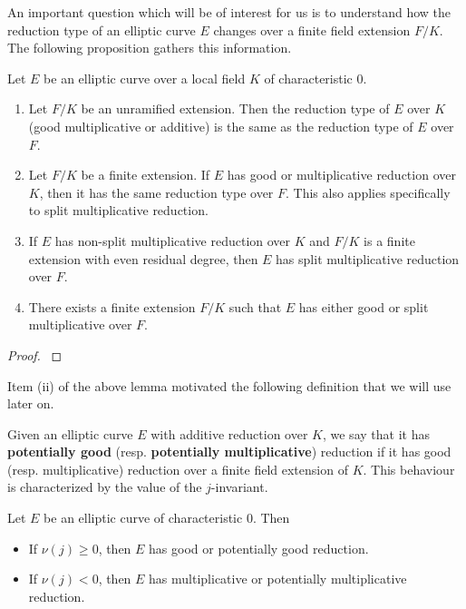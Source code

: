 An important question which will be of interest for us is to understand how the reduction type of an elliptic curve $E$ changes over a finite field extension $F/K$. The following proposition gathers this information.

\begin{prop}\label{prop_semi_red}
    Let $E$ be an elliptic curve over a local field $K$ of characteristic $0$. 
    \begin{enumerate}[label={(\roman*)}]
        \item Let $F/K$ be an unramified extension. Then the reduction type of $E$ over $K$ (good multiplicative or additive) is the same as the reduction type of $E$ over $F$.
        \item Let $F/K$ be a finite extension. If $E$ has good or multiplicative reduction over $K$, then it has the same reduction type over $F$. This also applies specifically to split multiplicative reduction.
        \item If $E$ has non-split multiplicative reduction over $K$ and $F/K$ is a finite extension with even residual degree, then $E$ has split multiplicative reduction over $F$. 
        \item There exists a finite extension $F/K$ such that $E$ has either good or split multiplicative over $F$.
    \end{enumerate}
\end{prop}
\begin{proof}
    \cite[\S VII Proposition 5.4]{S1} 
\end{proof}

Item (ii) of the above lemma motivated the following definition that we will use later on.

\begin{defn}
    
\end{defn}


Given an elliptic curve $E$ with additive reduction over $K$, we say that it has \textbf{potentially good} (resp. \textbf{potentially multiplicative}) reduction if it has good (resp. multiplicative) reduction over a finite field extension of $K$. This behaviour is characterized by the value of the $j$-invariant.

\begin{prop}\label{prop_j_inv}
    Let $E$ be an elliptic curve of characteristic $0$. Then
    \begin{itemize}
        \item If $\nu(j)\geq0$, then $E$ has good or potentially good reduction.
        \item If $\nu(j)<0$, then $E$ has multiplicative or potentially multiplicative reduction.
    \end{itemize}
\end{prop}

